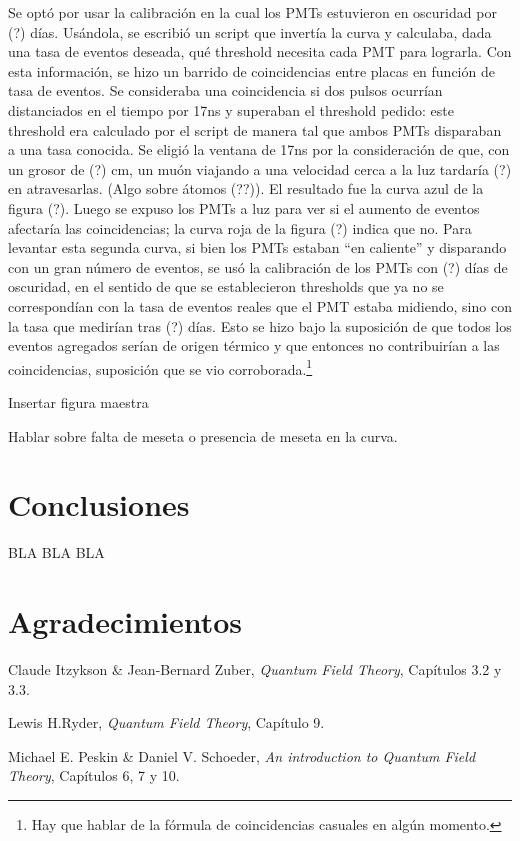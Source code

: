 \documentclass[12pt,a4paper]{article}
\numberwithin{equation}{section}
\begin{document}
	Se optó por usar la calibración en la cual los PMTs estuvieron en oscuridad por (?) días. Usándola, se escribió un script que invertía la curva y calculaba, dada una tasa de eventos deseada, qué threshold necesita cada PMT para lograrla. Con esta información, se hizo un barrido de coincidencias entre placas en función de tasa de eventos. Se consideraba una coincidencia si dos pulsos ocurrían distanciados en el tiempo por 17ns y superaban el threshold pedido: este threshold era calculado por el script de manera tal que ambos PMTs disparaban a una tasa conocida. Se eligió la ventana de 17ns por la consideración de que, con un grosor de (?) cm, un muón viajando a una velocidad cerca a la luz tardaría (?) en atravesarlas. (Algo sobre átomos (??)). El resultado fue la curva azul de la figura (?). Luego se expuso los PMTs a luz para ver si el aumento de eventos afectaría las coincidencias; la curva roja de la figura (?) indica que no. Para levantar esta segunda curva, si bien los PMTs estaban ``en caliente'' y disparando con un gran número de eventos, se usó la calibración de los PMTs con (?) días de oscuridad, en el sentido de que se establecieron thresholds que ya no se correspondían con la tasa de eventos reales que el PMT estaba midiendo, sino con la tasa que medirían tras (?) días. Esto se hizo bajo la suposición de que todos los eventos agregados serían de origen térmico y que entonces no contribuirían a las coincidencias, suposición que se vio corroborada.\footnote{Hay que hablar de la fórmula de coincidencias casuales en algún momento.}

Insertar figura maestra

Hablar sobre falta de meseta o presencia de meseta en la curva.

\section{Conclusiones}

BLA BLA BLA

\section{Agradecimientos}

\begin{thebibliography}{9}
	
	Claude Itzykson \& Jean-Bernard Zuber,
	\textit{Quantum Field Theory},
	Capítulos 3.2 y 3.3.
	
	Lewis H.Ryder,
	\textit{Quantum Field Theory},
	Capítulo 9.
	
	Michael E. Peskin \& Daniel V. Schoeder,
	\textit{An introduction to Quantum Field Theory},
	Capítulos 6, 7 y 10.
	
\end{thebibliography}
\end{document}
